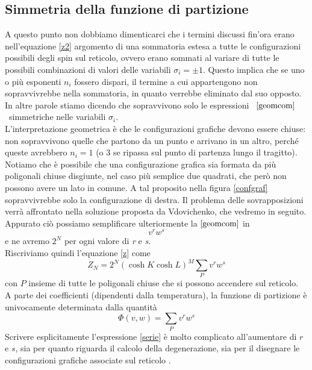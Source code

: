 \documentclass[11pt]{article}
\begin{document}
\subsection{Simmetria della funzione di partizione}
A questo punto non dobbiamo dimenticarci che i termini discussi fin'ora erano nell'equazione \ref{z2} argomento di una sommatoria  estesa a tutte le configurazioni possibili degli spin sul reticolo, ovvero erano sommati al variare di tutte le possibili combinazioni di valori delle variabili $\sigma_i=\pm1$. Questo implica che se uno o più esponenti $n_i$ fossero dispari, il termine a cui appartengono non sopravvivrebbe nella sommatoria, in quanto verrebbe eliminato dal suo opposto. In altre parole stiamo dicendo che sopravvivono solo le espressioni \ $\ref{geomcom}$ \  simmetriche nelle variabili $\sigma_i$. \\
 L'interpretazione geometrica è che le configurazioni grafiche devono essere chiuse: non sopravvivono quelle che partono da un punto e arrivano in un altro, perché queste avrebbero $n_i=1$ (o $3$ se ripassa sul punto di partenza lungo il tragitto). Notiamo che è possibile che una configurazione grafica sia formata da più poligonali chiuse disgiunte, nel caso più semplice due quadrati, che però non possono avere un lato in comune. A tal proposito nella figura \ref{confgraf} sopravvivrebbe solo la configurazione di destra. Il problema delle sovrapposizioni verrà affrontato nella soluzione proposta da Vdovichenko, che vedremo in seguito.\\
Appurato ciò possiamo semplificare ulteriormente la $\ref{geomcom}$ in
\begin{equation}\label{eq:test}
v^rw^s
\end{equation} 
e ne avremo $2^N$ per ogni valore di \emph{r} e \emph{s}.\\
Riscriviamo quindi l'equazione \ref{z} come
\begin{equation}\label{z3}
Z_N=2^N(\cosh{K}\cosh{L})^M\sum_Pv^rw^s
\end{equation}
con $P$ insieme di tutte le poligonali chiuse che si possono accendere sul reticolo.\\
A parte dei coefficienti (dipendenti dalla temperatura), la funzione di partizione è univocamente determinata dalla quantità
\begin{equation}\label{serie}
\Phi(v,w)=\sum_Pv^rw^s
\end{equation}
Scrivere esplicitamente l'espressione \ref{serie} è molto complicato all'aumentare di $r$ e $s$, sia per quanto riguarda il calcolo della degenerazione, sia per il disegnare le configurazioni grafiche associate sul reticolo .\\ 
\end{document}
